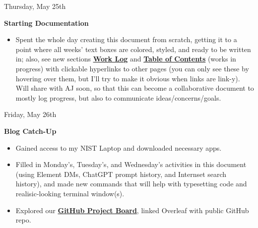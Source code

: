 \documentclass[11pt]{article}
\begin{document}
\begin{redbox}{Thursday, May 25th\vspace{-2.2em}\begin{flushright}\large\textbf{Starting Documentation} \end{flushright}}
    \begin{itemize}
        \item Spent the whole day creating this document from scratch, getting it to a point where all weeks' text boxes are colored, styled, and ready to be written in; also, see new sections \hyperlink{page.4}{\textbf{Work Log}} and \hyperlink{page.2}{\textbf{Table of Contents}} (works in progress) with clickable hyperlinks to other pages (you can only see these by hovering over them, but I'll try to make it obvious when links are link-y). Will share with AJ soon, so that this can become a collaborative document to mostly log progress, but also to communicate ideas/concerns/goals.
    \end{itemize}
\end{redbox}

\begin{center}
    \hspace{0.2cm}
    \vspace{-0.5em}
\end{center}

\begin{redbox}{Friday, May 26th\vspace{-2.2em}\begin{flushright}\large\textbf{Blog Catch-Up} \end{flushright}}
    \begin{itemize}
        \item Gained access to my NIST Laptop and downloaded necessary apps.
        \vspace{-0.65em}
        \item Filled in Monday's, Tuesday's, and Wednesday's activities in this document (using Element DMs, ChatGPT prompt history, and Internset search history), and made new commands that will help with typesetting code and realisic-looking terminal window(s). 
        \vspace{-2em}
        \item Explored our \href{https://github.com/users/aj-stein-nist/projects/2}{\textbf{GitHub Project Board}}, linked Overleaf with public GitHub repo.
    \end{itemize}
\end{redbox}
\end{document}
